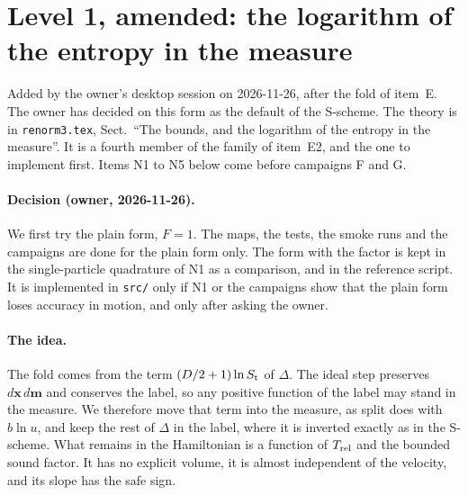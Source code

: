 \documentclass[11pt,aps,preprint,nofootinbib,superscriptaddress,tightenlines]{revtex4-2}
\let\oldparagraph\paragraph
\renewcommand{\paragraph}{\par\bigskip\oldparagraph}
\begin{document}
\section{Level 1, amended: the logarithm of the entropy in the measure}
\label{sec:amend}

Added by the owner's desktop session on 2026-11-26, after the fold of item~E.  The owner has decided on this form as the default of the S-scheme.
The theory is in \nolinkurl{renorm3.tex}, Sect.~``The bounds, and the logarithm of the entropy in the measure''.  It is a fourth member of the family
of item~E2, and the one to implement first.  Items N1 to N5 below come before campaigns F and G.

\paragraph{Decision (owner, 2026-11-26).}  We first try the plain form, $F=1$.  The maps, the tests, the smoke runs and the campaigns are done for
the plain form only.  The form with the factor is kept in the single-particle quadrature of N1 as a comparison, and in the reference script.  It is
implemented in \nolinkurl{src/} only if N1 or the campaigns show that the plain form loses accuracy in motion, and only after asking the owner.

\paragraph{The idea.}  The fold comes from the term $(D/2+1)\ln S_{\rm t}$ of $\Delta$.  The ideal step preserves $d\bm x\,d\bm m$ and conserves the
label, so any positive function of the label may stand in the measure.  We therefore move that term into the measure, as split does with $b\ln u$, and
keep the rest of $\Delta$ in the label, where it is inverted exactly as in the S-scheme.  What remains in the Hamiltonian is a function of
$T_{\rm rel}$ and the bounded sound factor.  It has no explicit volume, it is almost independent of the velocity, and its slope has the safe sign.
\end{document}
